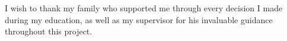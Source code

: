 

\begin{acknowledgements}
I wish to thank my family who supported me through every decision I made during
my education, as well as my supervisor for his invaluable guidance throughout
this project.



\end{acknowledgements}
